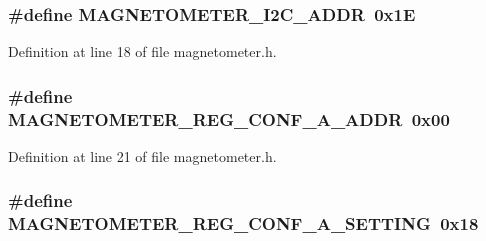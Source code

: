 \subsubsection[{\texorpdfstring{M\+A\+G\+N\+E\+T\+O\+M\+E\+T\+E\+R\+\_\+\+I2\+C\+\_\+\+A\+D\+DR}{MAGNETOMETER_I2C_ADDR}}]{\setlength{\rightskip}{0pt plus 5cm}\#define M\+A\+G\+N\+E\+T\+O\+M\+E\+T\+E\+R\+\_\+\+I2\+C\+\_\+\+A\+D\+DR~0x1E}\hypertarget{group___magnetometer_ga9bcee5ba1f09340b453fb5b2bf670369}{}\label{group___magnetometer_ga9bcee5ba1f09340b453fb5b2bf670369}


Definition at line 18 of file magnetometer.\+h.

\subsubsection[{\texorpdfstring{M\+A\+G\+N\+E\+T\+O\+M\+E\+T\+E\+R\+\_\+\+R\+E\+G\+\_\+\+C\+O\+N\+F\+\_\+\+A\+\_\+\+A\+D\+DR}{MAGNETOMETER_REG_CONF_A_ADDR}}]{\setlength{\rightskip}{0pt plus 5cm}\#define M\+A\+G\+N\+E\+T\+O\+M\+E\+T\+E\+R\+\_\+\+R\+E\+G\+\_\+\+C\+O\+N\+F\+\_\+\+A\+\_\+\+A\+D\+DR~0x00}\hypertarget{group___magnetometer_ga3c9504bb0b31caf63bc09ddbb2702fa7}{}\label{group___magnetometer_ga3c9504bb0b31caf63bc09ddbb2702fa7}


Definition at line 21 of file magnetometer.\+h.

\subsubsection[{\texorpdfstring{M\+A\+G\+N\+E\+T\+O\+M\+E\+T\+E\+R\+\_\+\+R\+E\+G\+\_\+\+C\+O\+N\+F\+\_\+\+A\+\_\+\+S\+E\+T\+T\+I\+NG}{MAGNETOMETER_REG_CONF_A_SETTING}}]{\setlength{\rightskip}{0pt plus 5cm}\#define M\+A\+G\+N\+E\+T\+O\+M\+E\+T\+E\+R\+\_\+\+R\+E\+G\+\_\+\+C\+O\+N\+F\+\_\+\+A\+\_\+\+S\+E\+T\+T\+I\+NG~0x18}\hypertarget{group___magnetometer_ga191f18f352cc117f9f963d09c4963778}{}\label{group___magnetometer_ga191f18f352cc117f9f963d09c4963778}


